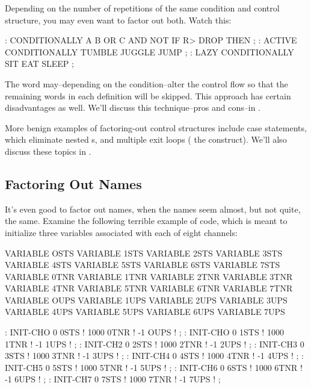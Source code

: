 \noindent 
Depending on the number of repetitions of the same condition and
control structure, you may even want to factor out both. Watch this:

\begin{Code}
: CONDITIONALLY   A B OR  C AND NOT IF  R> DROP   THEN ;
: ACTIVE   CONDITIONALLY   TUMBLE JUGGLE JUMP ;
: LAZY   CONDITIONALLY  SIT  EAT  SLEEP ;
\end{Code}
The word  may--depending on the condition--alter
the control flow so that the remaining words in each definition will be
skipped. This approach has certain disadvantages as well. We'll
discuss this technique--pros and cons--in .

More benign examples of factoring-out control structures include case
statements, which eliminate nested s, and multiple exit loops ( the  construct). We'll also discuss these topics in
.

\subsection{{Factoring Out Names}}
It's even good to factor out names, when the names seem almost, but
not quite, the same. Examine the following terrible example of code,
which is meant to initialize three variables associated with each of
eight channels:

\begin{Code}
VARIABLE OSTS       VARIABLE 1STS       VARIABLE 2STS 
VARIABLE 3STS       VARIABLE 4STS       VARIABLE 5STS
VARIABLE 6STS       VARIABLE 7STS       VARIABLE 0TNR
VARIABLE 1TNR       VARIABLE 2TNR       VARIABLE 3TNR
VARIABLE 4TNR       VARIABLE 5TNR       VARIABLE 6TNR
VARIABLE 7TNR       VARIABLE OUPS       VARIABLE 1UPS
VARIABLE 2UPS       VARIABLE 3UPS       VARIABLE 4UPS
VARIABLE 5UPS       VARIABLE 6UPS       VARIABLE 7UPS
\end{Code}

\begin{Code} 
: INIT-CHO   0 0STS !  1000 0TNR !  -1 OUPS ! ; 
: INIT-CHO   0 1STS !  1000 1TNR !  -1 1UPS ! ; 
: INIT-CH2   0 2STS !  1000 2TNR !  -1 2UPS ! ; 
: INIT-CH3   0 3STS !  1000 3TNR !  -1 3UPS ! ; 
: INIT-CH4   0 4STS !  1000 4TNR !  -1 4UPS ! ; 
: INIT-CH5   0 5STS !  1000 5TNR !  -1 5UPS ! ; 
: INIT-CH6   0 6STS !  1000 6TNR !  -1 6UPS ! ; 
: INIT-CH7   0 7STS !  1000 7TNR !  -1 7UPS ! ; 
\end{Code}

